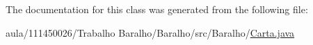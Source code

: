 \-The documentation for this class was generated from the following file\-:\begin{DoxyCompactItemize}
\item 
aula/111450026/\-Trabalho Baralho/\-Baralho/src/\-Baralho/\hyperlink{_carta_8java}{\-Carta.\-java}\end{DoxyCompactItemize}
